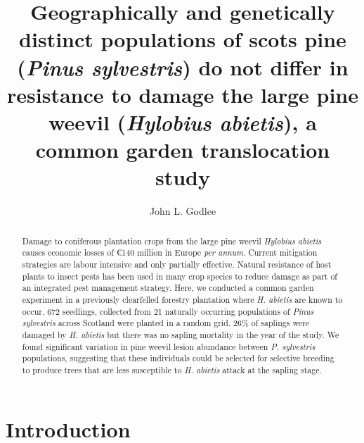 \documentclass[a4paper, 11pt]{article}
\title{Geographically and genetically distinct populations of scots pine (\textit{Pinus sylvestris}) do not differ in resistance to damage the large pine weevil (\textit{Hylobius abietis}), a common garden translocation study}
\author{John L. Godlee}
\begin{document}

\maketitle{}

\begin{abstract}
	Damage to coniferous plantation crops from the large pine weevil \textit{Hylobius abietis} causes economic losses of \euro{}140 million in Europe \textit{per annum}. Current mitigation strategies are labour intensive and only partially effective. Natural resistance of host plants to insect pests has been used in many crop species to reduce damage as part of an integrated pest management strategy. Here, we conducted a common garden experiment in a previously clearfelled forestry plantation where \textit{H. abietis} are known to occur. 672 seedlings, collected from 21 naturally occurring populations of \textit{Pinus sylvestris} across Scotland were planted in a random grid. 26\% of saplings were damaged by \textit{H. abietis} but there was no sapling mortality in the year of the study. We found significant variation in pine weevil lesion abundance between \textit{P. sylvestris} populations, suggesting that these individuals could be selected for selective breeding to produce trees that are less susceptible to \textit{H. abietis} attack at the sapling stage.

\end{abstract}

\section*{Introduction}
\end{document}
